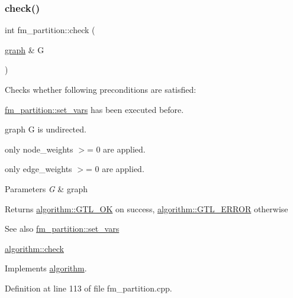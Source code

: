 \subsubsection{\texorpdfstring{check()}{check()}}
{\footnotesize\ttfamily int fm\+\_\+partition\+::check (\begin{DoxyParamCaption}\item[{\mbox{\hyperlink{classgraph}{graph}} \&}]{G }\end{DoxyParamCaption})\hspace{0.3cm}{\ttfamily [virtual]}}

Checks whether following preconditions are satisfied\+: 
\begin{DoxyItemize}
\item \mbox{\hyperlink{classfm__partition_aa15471da2b6a0f14060b0c4091c6b05c}{fm\+\_\+partition\+::set\+\_\+vars}} has been executed before. 
\item graph {\ttfamily G} is undirected. 
\item only node\+\_\+weights $>$= 0 are applied. 
\item only edge\+\_\+weights $>$= 0 are applied. 
\end{DoxyItemize}


\begin{DoxyParams}{Parameters}
{\em G} & graph \\
\hline
\end{DoxyParams}
\begin{DoxyReturn}{Returns}
{\ttfamily \mbox{\hyperlink{classalgorithm_af1a0078e153aa99c24f9bdf0d97f6710a5114c20e4a96a76b5de9f28bf15e282b}{algorithm\+::\+G\+T\+L\+\_\+\+OK}}} on success, {\ttfamily \mbox{\hyperlink{classalgorithm_af1a0078e153aa99c24f9bdf0d97f6710a6fcf574690bbd6cf710837a169510dd7}{algorithm\+::\+G\+T\+L\+\_\+\+E\+R\+R\+OR}}} otherwise 
\end{DoxyReturn}
\begin{DoxySeeAlso}{See also}
\mbox{\hyperlink{classfm__partition_aa15471da2b6a0f14060b0c4091c6b05c}{fm\+\_\+partition\+::set\+\_\+vars}} 

\mbox{\hyperlink{classalgorithm_a76361fb03ad1cf643affc51821e43bed}{algorithm\+::check}} 
\end{DoxySeeAlso}


Implements \mbox{\hyperlink{classalgorithm_a76361fb03ad1cf643affc51821e43bed}{algorithm}}.



Definition at line 113 of file fm\+\_\+partition.\+cpp.


